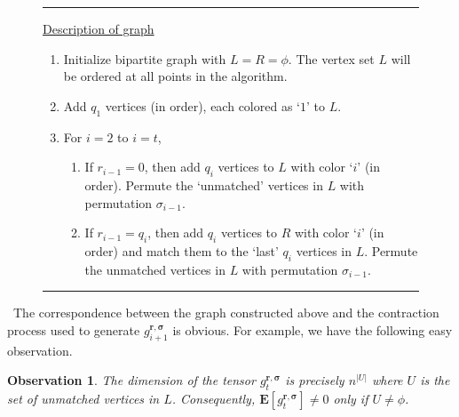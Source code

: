 \documentclass{toc}
\newtheorem{obs}[theorem]{Observation}
\begin{document}
\begin{figure}[htb]
\hrule
\vline
\begin{minipage}[t]{0.98\linewidth}
\vspace{10 pt}
\begin{center}
\begin{minipage}[h]{0.95\linewidth}

%
%
%
%
%
%
%

\vspace{3 pt}
\underline{\textsf{Description of graph}}
\begin{enumerate}
\item Initialize bipartite graph with $L = R = \phi$. The vertex set $L$ will be ordered at all points in the algorithm. 

\item Add $q_1$ vertices (in order), each colored as `$1$' to $L$. 

\item For $i = 2$ to $i = t$, 
\begin{enumerate}
\item If $r_{i-1} =0$, then add $q_i$ vertices to $L$ with color `$i$' (in order). Permute the `unmatched' vertices in $L$ with permutation $\sigma_{i-1}$. 
\item If $r_{i-1} = q_i$, then add $q_i$ vertices to $R$ with color `$i$' (in order) and match them to the `last' $q_i$ vertices in $L$. Permute the unmatched vertices in $L$ with permutation $\sigma_{i-1}$. 
\end{enumerate}
\end{enumerate}

\vspace{5 pt}

\end{minipage}
\end{center}

\end{minipage}
\hfill \vline
\hrule
%
\label{fig:DS}
\end{figure}%
%
%
%
%
%
%
%
%
%
~The correspondence between the graph constructed above and the contraction process used to generate $g^{\mathbf{r}, \boldsymbol{\sigma}}_{i+1}$ is obvious. For example, we have the following easy observation. 
\begin{obs}
The dimension of the tensor $g^{\mathbf{r}, \boldsymbol{\sigma}}_t$ is precisely $n^{|U|}$ where $U$ is the set of unmatched vertices in $L$. Consequently, 
$\mathbf{E}[g^{\mathbf{r}, \boldsymbol{\sigma}}_t] \neq 0$ only if $U \neq  \phi$. 
\end{obs} 
\end{document}
